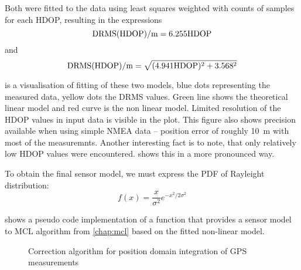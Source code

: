 Both were fitted to the data using least squares weighted with counts of samples
for each HDOP, resulting in the expressions
\begin{equation}
\mathrm{DRMS}(\mathrm{HDOP}) / \si{\meter} = \num{6.255} \mathrm{HDOP}
\end{equation}
and
\begin{equation}
\mathrm{DRMS}(\mathrm{HDOP}) / \si{\meter} = \sqrt{(\num{4.941}\mathrm{HDOP})^2 + \num{3.568}^2}
\end{equation}

 is a visualisation of fitting of these two models,
blue dots representing the measured data, yellow dots the DRMS values.
Green line shows the theoretical linear model and red curve is the non linear model.
Limited resolution of the HDOP values in input data is visible in the plot.
This figure also shows precision available when using simple NMEA data --
position error of roughly \SI{10}{\meter} with most of the measuremnts.
Another interesting fact is to note, that only relatively low HDOP values were encountered.
 shows this in a more pronounced way.

To obtain the final sensor model, we must express the PDF of Rayleight distribution:
\begin{equation}
    f(x) = \frac{x}{\sigma^2}e^{-x^2/2\sigma^2}
\end{equation}

 shows a pseudo code implementation of a function
that provides a sensor model to MCL algorithm from \cref{chap:mcl} based on the
fitted non-linear model.

\begin{figure}[tp]
\begin{algorithm}[H]


\end{algorithm}
\caption{Correction algorithm for position domain integration of GPS measurements}
\label{algo:gps-position-domain}
\end{figure}


